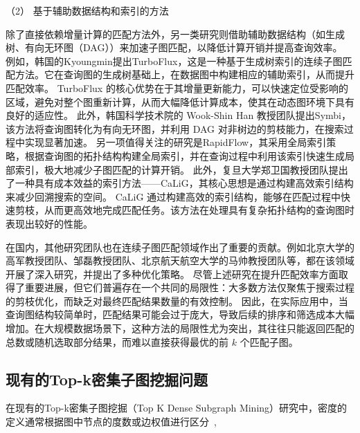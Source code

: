 （2） 基于辅助数据结构和索引的方法

除了直接依赖增量计算的匹配方法外，另一类研究则借助辅助数据结构（如生成树、有向无环图（DAG））来加速子图匹配，以降低计算开销并提高查询效率。
例如，韩国的Kyoungmin提出TurboFlux\cite{csm-turboflux-DBLP:conf/sigmod/KimSHLHCSJ18}，这是一种基于生成树索引的连续子图匹配方法。它在查询图的生成树基础上，在数据图中构建相应的辅助索引，从而提升匹配效率。
TurboFlux 的核心优势在于其增量更新能力，可以快速定位受影响的区域，避免对整个图重新计算，从而大幅降低计算成本，使其在动态图环境下具有良好的适应性。
此外，韩国科学技术院的 Wook-Shin Han 教授团队提出Symbi\cite{csm-symbi-DBLP:journals/pvldb/MinPPGIH21}，该方法将查询图转化为有向无环图，并利用 DAG 对非树边的剪枝能力，在搜索过程中实现显著加速。
另一项值得关注的研究是RapidFlow\cite{csm-rapidflow-DBLP:journals/pvldb/SunSHL22}，其采用全局索引策略，根据查询图的拓扑结构构建全局索引，并在查询过程中利用该索引快速生成局部索引，极大地减少子图匹配的计算开销。
此外，复旦大学郑卫国教授团队提出了一种具有成本效益的索引方法——CaLiG\cite{csm-calig-DBLP:journals/pacmmod/YangZZY23}，其核心思想是通过构建高效索引结构来减少回溯搜索的空间。
CaLiG 通过构建高效的索引结构，能够在匹配过程中快速剪枝，从而更高效地完成匹配任务。该方法在处理具有复杂拓扑结构的查询图时表现出较好的性能。

在国内，其他研究团队也在连续子图匹配领域作出了重要的贡献。例如北京大学的高军教授团队、邹磊教授团队、北京航天航空大学的马帅教授团队等，都在该领域开展了深入研究，并提出了多种优化策略。
尽管上述研究在提升匹配效率方面取得了重要进展，但它们普遍存在一个共同的局限性：大多数方法仅聚焦于搜索过程的剪枝优化，而缺乏对最终匹配结果数量的有效控制。
因此，在实际应用中，当查询图结构较简单时，匹配结果可能会过于庞大，导致后续的排序和筛选成本大幅增加。在大规模数据场景下，这种方法的局限性尤为突出，其往往只能返回匹配的总数或随机选取部分结果，而难以直接获得最优的前 $k$ 个匹配子图。
\subsection{现有的Top-k密集子图挖掘问题}
在现有的Top-k密集子图挖掘（Top K Dense Subgraph Mining）研究中，密度的定义通常根据图中节点的度数或边权值进行区分~\cite{dsm-noweight-Bahmani-DBLP:journals/pvldb/BahmaniKV12,dsm-noweight-Balalau-DBLP:conf/wsdm/BalalauBCGS15,dsm-noweight-Bonchi-DBLP:journals/corr/abs-2007-01533,dsm-noweight-Dondi-DBLP:journals/corr/abs-2002-07695,dsm-noweight-Fang-DBLP:journals/pvldb/FangYCLL19,dsm-noweight-Gabert-DBLP:conf/wsdm/GabertPC21,dsm-noweight-Hu-DBLP:conf/cikm/HuWC17,dsm-noweight-Ma-DBLP:journals/pvldb/MaCLH22,dsm-noweight-Mathieu-DBLP:journals/corr/abs-2010-07794,dsm-noweight-McGregor-DBLP:journals/corr/McGregorTVV15,dsm-noweight-Rozenshtein-DBLP:journals/tkdd/RozenshteinTG17,dsm-noweight-Saha-DBLP:journals/corr/abs-2212-08820,dsm-noweight-Tsourakakis-DBLP:conf/kdd/TsourakakisBGGT13,dsm-noweight-Valari-DBLP:conf/ssdbm/ValariKP12,dsm-noweight-Zhao-DBLP:conf/icalip/ZhaoQYB14,dsm-weight-Angel-DBLP:journals/vldb/AngelKSSST14,dsm-weight-Ma-DBLP:conf/icde/MaHWLH17,dsm-weight-Muhammad-DBLP:conf/cikm/NasirGMG17},

